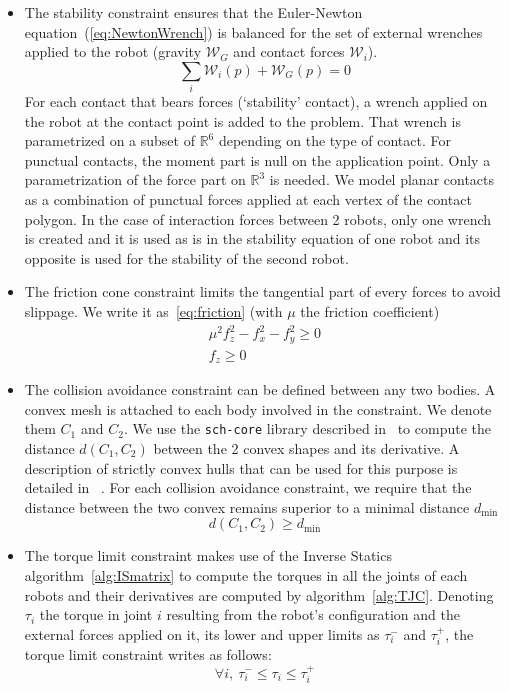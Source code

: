 \begin{itemize}
\item The stability constraint ensures that the Euler-Newton equation~(\ref{eq:NewtonWrench}) is balanced for the set of external wrenches applied to the robot (gravity $\mathcal{W}_G$ and contact forces $\mathcal{W}_i$).
  \begin{equation}
    \sum_{i}{\mathcal{W}_i(p)} + {\mathcal{W}_G(p)} = 0
    \label{eq:NewtonWrench}
  \end{equation}
  For each contact that bears forces (`stability' contact), a wrench applied on the robot at the contact point is added to the problem.
  That wrench is parametrized on a subset of $\mathbb{R}^6$ depending on the type of contact.
  For punctual contacts, the moment part is null on the application point.
  Only a parametrization of the force part on $\mathbb{R}^3$ is needed.
  We model planar contacts as a combination of punctual forces applied at each vertex of the contact polygon.
  In the case of interaction forces between 2 robots, only one wrench is created and it is used as is in the stability equation of one robot and its opposite is used for the stability of the second robot.

\item The friction cone constraint limits the tangential part of every forces to avoid slippage.
We write it as~\ref{eq:friction} (with $\mu$ the friction coefficient)
\begin{equation}
  \begin{split}
    \mu^2f_z^2-f_x^2-f_y^2 \geq 0 \\
    f_z \geq 0
  \end{split}
  \label{eq:friction}
\end{equation}

\item The collision avoidance constraint can be defined between any two bodies.
A convex mesh is attached to each body involved in the constraint.
We denote them $C_1$ and $C_2$.
We use the {\tt sch-core} library described in~\cite{benallegue:icra:2009} to compute the distance $d(C_1,C_2)$ between the 2 convex shapes and its derivative.
A description of strictly convex hulls that can be used for this purpose is detailed in ~\cite{escande:itro:2014}.
For each collision avoidance constraint, we require that the distance between the two convex remains superior to a minimal distance $d_{\min}$
\begin{equation}
  d(C_1, C_2)\geq d_{\min}
\end{equation}

\item The torque limit constraint makes use of the Inverse Statics algorithm~\ref{alg:ISmatrix} to compute the torques in all the joints of each robots and their derivatives are computed by algorithm~\ref{alg:TJC}.
Denoting $\tau_i$ the torque in joint $i$ resulting from the robot's configuration and the external forces applied on it, its lower and upper limits as $\tau_i^-$ and $\tau_i^+$, the torque limit constraint writes as follows:
\begin{equation}
  \forall i,\ \tau_i^- \leq \tau_i \leq \tau_i^+
\end{equation}
\end{itemize}

